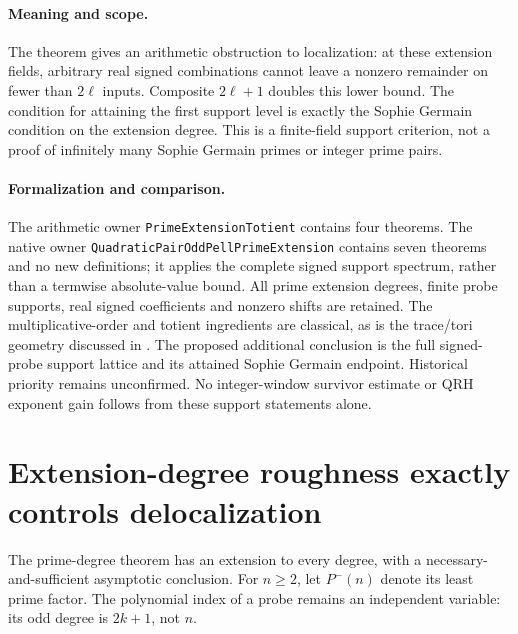 \documentclass[11pt]{article}
\begin{document}
\paragraph{Meaning and scope.}
The theorem gives an arithmetic obstruction to localization:
at these extension fields, arbitrary real signed combinations
cannot leave a nonzero remainder on fewer than \(2\ell\)
inputs. Composite \(2\ell+1\) doubles this lower bound.
The condition for attaining the first support level is exactly
the Sophie Germain condition on the extension degree.
This is a finite-field support criterion, not a proof of
infinitely many Sophie Germain primes or integer prime pairs.

\paragraph{Formalization and comparison.}
The arithmetic owner \texttt{PrimeExtensionTotient} contains
four theorems. The native owner
\texttt{QuadraticPairOddPellPrimeExtension} contains seven
theorems and no new definitions; it applies the complete
signed support spectrum, rather than a termwise absolute-value
bound. All prime extension degrees, finite probe supports,
real signed coefficients and nonzero shifts are retained.
The multiplicative-order and totient ingredients are classical,
as is the trace/tori geometry discussed in
\cite{GassertChebyshevGraphs}. The proposed additional conclusion
is the full signed-probe support lattice and its attained
Sophie Germain endpoint. Historical priority remains unconfirmed.
No integer-window survivor estimate or QRH exponent gain follows
from these support statements alone.

\section{Extension-degree roughness exactly controls delocalization}
\label{sec:odd-pell-extension-roughness}

The prime-degree theorem has an extension to every degree,
with a necessary-and-sufficient asymptotic conclusion.
For \(n\ge2\), let \(P^-(n)\) denote its least prime factor.
The polynomial index of a probe remains an independent
variable: its odd degree is \(2k+1\), not \(n\).
\end{document}
